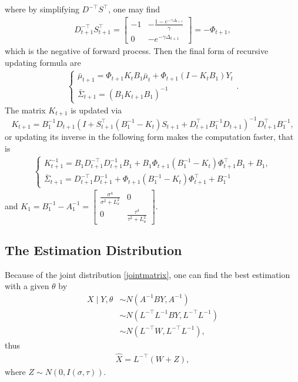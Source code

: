 where by simplifying $D^{-\top}S^\top$, one may find 
\begin{align*}
D_{t+1}^{-\top}S_{t+1}^\top = \begin{bmatrix}
-1 & -\frac{1-e^{-\gamma \Delta_{t+1}}}{\gamma} \\ 0 & - e^{-\gamma \Delta_{t+1}}
\end{bmatrix} = -\Phi_{t+1},
\end{align*}
which is the negative of forward process. Then the final form of recursive updating formula are 
\begin{align}
\begin{cases}
\bar{\mu}_{t+1}=\Phi_{t+1} K_tB_1\bar{\mu}_t + \Phi_{t+1} \left(I-K_tB_1\right)Y_t\\
\bar{\Sigma}_{t+1}=\left( B_1K_{t+1}B_1  \right)^{-1}
\end{cases}.
\end{align}
The matrix $K_{t+1}$ is updated via 
\begin{equation}
K_{t+1} =B_1^{-1}D_{t+1} \left(I+ S_{t+1}^\top \left(B_1^{-1} - K_t\right)  S_{t+1} +D_{t+1}^\top B_1^{-1}D_{t+1}  \right)^{-1}  D_{t+1}^\top B_1^{-1},
\end{equation}
or updating its inverse in the following form makes the computation faster, that is 
\begin{align*}
\begin{cases}
K_{t+1}^{-1} = B_1D_{t+1}^{-\top}D_{t+1}^{-1}B_1 + B_1\Phi_{t+1} \left(B_1^{-1} - K_t\right) \Phi_{t+1}^\top B_1+ B_1,\\
\bar{\Sigma}_{t+1} = D_{t+1}^{-\top}D_{t+1}^{-1}+ \Phi_{t+1} \left(B_1^{-1} - K_t\right) \Phi_{t+1}^\top + B_1^{-1}
\end{cases}
\end{align*}
and $K_1 =B_1^{-1} - A_1^{-1} = \begin{bmatrix}
\frac{\sigma^4}{\sigma^2 +L_x^2} & 0 \\ 0 &\frac{\tau^4}{\tau^2 +L_u^2}
\end{bmatrix} $.



\subsection*{The Estimation Distribution}

Because of the joint distribution \eqref{jointmatrix}, one can find the best estimation with a given $\theta$ by
\begin{align*}
X \mid Y,\theta &\sim N \left( A^{-1}BY, A^{-1} \right) \\
&\sim N\left(L^{-\top}L^{-1}BY,L^{-\top}L^{-1}\right)\\
&\sim N\left(L^{-\top}W,L^{-\top}L^{-1}\right),
\end{align*}
thus
\begin{align*}
\hat{X} = L^{-\top}\left(W+Z\right),
\end{align*}
where $Z \sim N\left(0, I\left(\sigma,\tau\right)\right)$.


